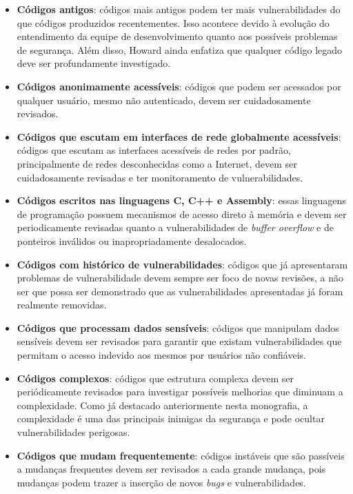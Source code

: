 %

\begin{itemize}
\item \textbf{Códigos antigos}: códigos mais antigos podem ter mais vulnerabilidades do que códigos produzidos recentementes. Isso acontece devido à evolução do entendimento da equipe de desenvolvimento quanto aos possíveis problemas de segurança. Além disso, Howard ainda enfatiza que qualquer código legado deve ser profundamente investigado.

\item \textbf{Códigos anonimamente acessíveis}: códigos que podem ser acessados por qualquer usuário, mesmo não autenticado, devem ser cuidadosamente revisados.

\item \textbf{Códigos que escutam em interfaces de rede globalmente acessíveis}: códigos que escutam as interfaces acessíveis de redes por padrão, principalmente de redes desconhecidas como a Internet, devem ser cuidadosamente revisadas e ter monitoramento de vulnerabilidades.

\item \textbf{Códigos escritos nas linguagens C, C++ e Assembly}: essas linguagens de programação possuem mecanismos de acesso direto à memória e devem ser periodicamente revisadas quanto a vulnerabilidades de \emph{buffer overflow} e de ponteiros inválidos ou inapropriadamente desalocados.

\item \textbf{Códigos com histórico de vulnerabilidades}: códigos que já apresentaram problemas de vulnerabilidade devem sempre ser foco de novas revisões, a não ser que possa ser demonstrado que as vulnerabilidades apresentadas já foram realmente removidas.

\item \textbf{Códigos que processam dados sensíveis}: códigos que manipulam dados sensíveis devem ser revisados para garantir que existam vulnerabilidades que permitam o acesso indevido aos mesmos por usuários não confiáveis.

\item \textbf{Códigos complexos}: códigos que estrutura complexa devem ser periódicamente revisados para investigar possíveis melhorias que diminuam a complexidade. Como já destacado anteriormente nesta monografia, a complexidade é uma das principais inimigas da segurança e pode ocultar vulnerabilidades perigosas.

\item \textbf{Códigos que mudam frequentemente}: códigos instáveis que são passíveis a mudanças frequentes devem ser revisados a cada grande mudança, pois mudanças podem trazer a inserção de novos \emph{bugs} e vulnerabilidades.
\end{itemize}


